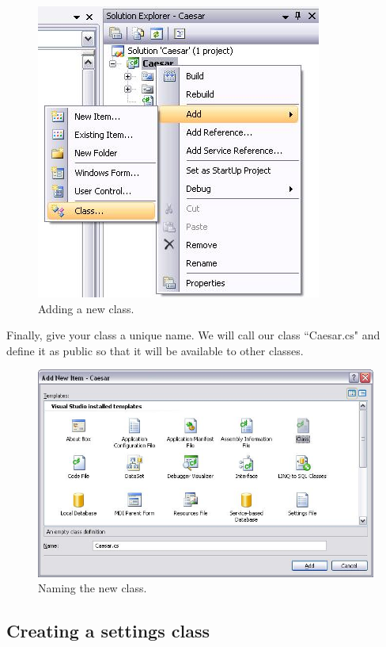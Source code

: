 \begin{figure}[h]
	\centering
		\includegraphics{figures/add_new_class.jpg}
	\caption{Adding a new class.}
	\label{fig:add_new_class}
\end{figure}
\clearpage

Finally, give your class a unique name. We will call our class ``Caesar.cs" and define it as public so that it will be available to other classes.

\begin{figure}[h!]
	\centering
		\includegraphics[width=1.00\textwidth]{figures/name_new_class.jpg}
	\caption{Naming the new class.}
	\label{fig:name_new_class}
\end{figure}

\subsection{Creating a settings class}
\label{sec:CreatingASettingsClass}

